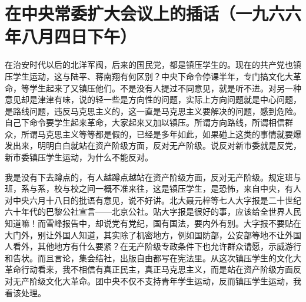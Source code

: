 \section[在中央常委扩大会议上的插话（一九六六年八月四日下午）]{在中央常委扩大会议上的插话（一九六六年八月四日下午）}


在治安时代以后的北洋军阀，后来的国民党，都是镇压学生的。现在的共产党也镇压学生运动，这与陆平、蒋南翔有何区别？中央下命令停课半年，专门搞文化大革命，等学生起来了又镇压他们。不是没有人提过不同意见，就是听不进。对另一种意见却是津津有味，说的轻一些是方向性的问题，实际上方向问题就是中心问题，是路线问题，违反马克思主义的，这一直是马克思主义要解决的问题，感到危险。自己下命令要学生起来革命，大家起来又加以镇压。所谓方向路线，所谓相信群众，所谓马克思主义等等都是假的，已经是多年如此，如果碰上这类的事情就要爆发出来，明明白白就站在资产阶级方面，反对无产阶级。说反对新市委就是反党，新市委镇压学生运动，为什么不能反对。

我是没有下去蹲点的，有人越蹲点越站在资产阶级方面，反对无产阶级。规定班与班，系与系，校与校之间一概不准来往，这是镇压学生，是恐怖，来自中央，有人对中央六月十八日的批语有意见，说不好讲。北大聂元梓等七人大字报是二十世纪六十年代的巴黎公社宣言——北京公社。贴大字报是很好的事，应该给全世界人民知道嘛！而雪峰报告中，却说党有党纪，国有国法，要内外有别。大字报不要贴在大门外，别让外国人知道，其实除了机密地方，例如国防部，公安部等地不让外国人看外，其他地方有什么要紧？在无产阶级专政条件下也允许群众请愿，示威游行和告状。而且言论，集会结社，出版自由都写在宪法里。从这次镇压学生的文化大革命行动看来，我不相信有真正民主，真正马克思主义，而是站在资产阶级方面反对无产阶级文化大革命。团中央不仅不支持青年学生运动，反而镇压学生运动，我看该处理。


